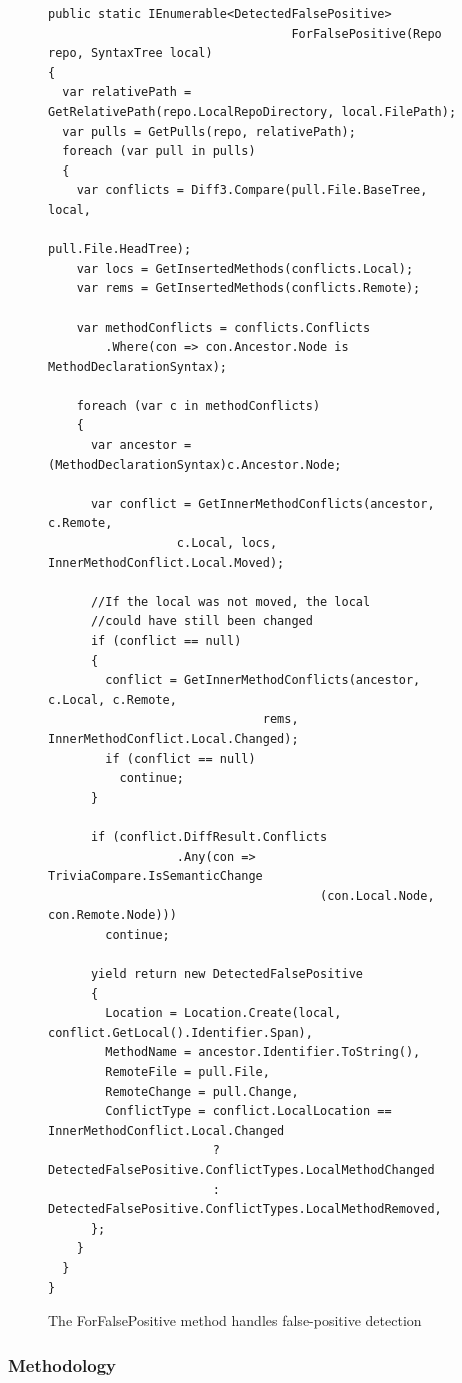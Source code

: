 \documentclass[draftclsnofoot,onecolumn]{IEEEtran}
\begin{document}
\begin{figure}[!h]
\centering
\begin{lstlisting}
public static IEnumerable<DetectedFalsePositive> 
                                  ForFalsePositive(Repo repo, SyntaxTree local)
{
  var relativePath = GetRelativePath(repo.LocalRepoDirectory, local.FilePath);
  var pulls = GetPulls(repo, relativePath);
  foreach (var pull in pulls)
  {
    var conflicts = Diff3.Compare(pull.File.BaseTree, local, 
                                                        pull.File.HeadTree);
    var locs = GetInsertedMethods(conflicts.Local);
    var rems = GetInsertedMethods(conflicts.Remote);

    var methodConflicts = conflicts.Conflicts
        .Where(con => con.Ancestor.Node is MethodDeclarationSyntax);

    foreach (var c in methodConflicts)
    {
      var ancestor = (MethodDeclarationSyntax)c.Ancestor.Node;

      var conflict = GetInnerMethodConflicts(ancestor, c.Remote,
                  c.Local, locs, InnerMethodConflict.Local.Moved);

      //If the local was not moved, the local 
      //could have still been changed
      if (conflict == null)
      {
        conflict = GetInnerMethodConflicts(ancestor, c.Local, c.Remote, 
                              rems, InnerMethodConflict.Local.Changed);
        if (conflict == null)
          continue;
      }

      if (conflict.DiffResult.Conflicts
                  .Any(con => TriviaCompare.IsSemanticChange
                                      (con.Local.Node, con.Remote.Node)))
        continue;

      yield return new DetectedFalsePositive
      {
        Location = Location.Create(local, conflict.GetLocal().Identifier.Span),
        MethodName = ancestor.Identifier.ToString(),
        RemoteFile = pull.File,
        RemoteChange = pull.Change,
        ConflictType = conflict.LocalLocation == InnerMethodConflict.Local.Changed
                       ? DetectedFalsePositive.ConflictTypes.LocalMethodChanged
                       : DetectedFalsePositive.ConflictTypes.LocalMethodRemoved,
      };
    }
  }
}
\end{lstlisting}
\caption{The ForFalsePositive method handles false-positive detection}
\label{anforfp}
\end{figure}

\subsubsection{Methodology}
\end{document}
